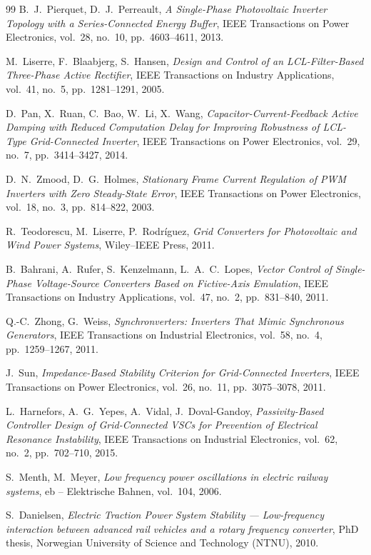 \begin{thebibliography}{99}
 B.~J.~Pierquet, D.~J.~Perreault, \emph{A Single-Phase Photovoltaic Inverter Topology with a Series-Connected Energy Buffer}, IEEE Transactions on Power Electronics, vol.~28, no.~10, pp.~4603--4611, 2013.

 M.~Liserre, F.~Blaabjerg, S.~Hansen, \emph{Design and Control of an LCL-Filter-Based Three-Phase Active Rectifier}, IEEE Transactions on Industry Applications, vol.~41, no.~5, pp.~1281--1291, 2005.

 D.~Pan, X.~Ruan, C.~Bao, W.~Li, X.~Wang, \emph{Capacitor-Current-Feedback Active Damping with Reduced Computation Delay for Improving Robustness of LCL-Type Grid-Connected Inverter}, IEEE Transactions on Power Electronics, vol.~29, no.~7, pp.~3414--3427, 2014.

 D.~N.~Zmood, D.~G.~Holmes, \emph{Stationary Frame Current Regulation of PWM Inverters with Zero Steady-State Error}, IEEE Transactions on Power Electronics, vol.~18, no.~3, pp.~814--822, 2003.

 R.~Teodorescu, M.~Liserre, P.~Rodríguez, \emph{Grid Converters for Photovoltaic and Wind Power Systems}, Wiley--IEEE Press, 2011.

 B.~Bahrani, A.~Rufer, S.~Kenzelmann, L.~A.~C.~Lopes, \emph{Vector Control of Single-Phase Voltage-Source Converters Based on Fictive-Axis Emulation}, IEEE Transactions on Industry Applications, vol.~47, no.~2, pp.~831--840, 2011.

 Q.-C.~Zhong, G.~Weiss, \emph{Synchronverters: Inverters That Mimic Synchronous Generators}, IEEE Transactions on Industrial Electronics, vol.~58, no.~4, pp.~1259--1267, 2011.

 J.~Sun, \emph{Impedance-Based Stability Criterion for Grid-Connected Inverters}, IEEE Transactions on Power Electronics, vol.~26, no.~11, pp.~3075--3078, 2011.

 L.~Harnefors, A.~G.~Yepes, A.~Vidal, J.~Doval-Gandoy, \emph{Passivity-Based Controller Design of Grid-Connected VSCs for Prevention of Electrical Resonance Instability}, IEEE Transactions on Industrial Electronics, vol.~62, no.~2, pp.~702--710, 2015.

 S.~Menth, M.~Meyer, \emph{Low frequency power oscillations in electric railway systems}, eb -- Elektrische Bahnen, vol.~104, 2006.

 S.~Danielsen, \emph{Electric Traction Power System Stability --- Low-frequency interaction between advanced rail vehicles and a rotary frequency converter}, PhD thesis, Norwegian University of Science and Technology (NTNU), 2010.


\end{thebibliography}

